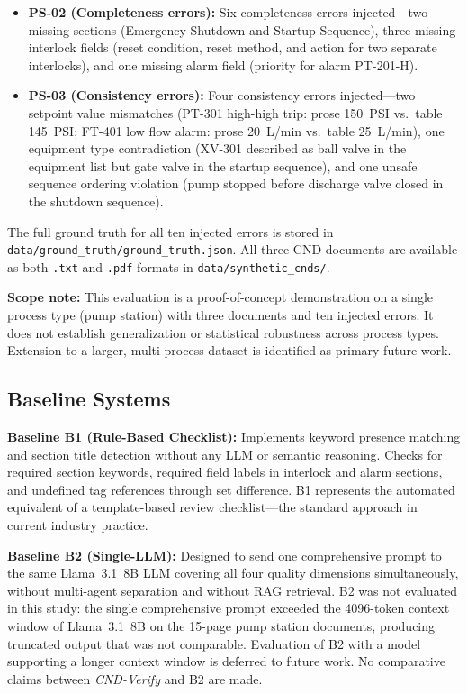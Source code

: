 \documentclass[journal]{IEEEtran}
\newcommand{\sys}{\textit{CND-Verify}}
\begin{document}
\begin{itemize}
  \item \textbf{PS-02 (Completeness errors):} Six completeness errors
  injected---two missing sections (Emergency Shutdown and Startup Sequence),
  three missing interlock fields (reset condition, reset method, and action for
  two separate interlocks), and one missing alarm field (priority for alarm
  PT-201-H).

  \item \textbf{PS-03 (Consistency errors):} Four consistency errors
  injected---two setpoint value mismatches (PT-301 high-high trip: prose
  150~PSI vs.\ table 145~PSI; FT-401 low flow alarm: prose 20~L/min vs.\ table
  25~L/min), one equipment type contradiction (XV-301 described as ball valve
  in the equipment list but gate valve in the startup sequence), and one unsafe
  sequence ordering violation (pump stopped before discharge valve closed in the
  shutdown sequence).
\end{itemize}

The full ground truth for all ten injected errors is stored in
\texttt{data/ground\_truth/ground\_truth.json}. All three CND documents are
available as both \texttt{.txt} and \texttt{.pdf} formats in
\texttt{data/synthetic\_cnds/}.

\textbf{Scope note:} This evaluation is a proof-of-concept demonstration on a
single process type (pump station) with three documents and ten injected errors.
It does not establish generalization or statistical robustness across process
types. Extension to a larger, multi-process dataset is identified as primary
future work.

\subsection{Baseline Systems}

\textbf{Baseline B1 (Rule-Based Checklist):} Implements keyword presence
matching and section title detection without any LLM or semantic reasoning.
Checks for required section keywords, required field labels in interlock and
alarm sections, and undefined tag references through set difference. B1
represents the automated equivalent of a template-based review
checklist---the standard approach in current industry practice.

\textbf{Baseline B2 (Single-LLM):} Designed to send one comprehensive prompt
to the same Llama~3.1~8B LLM covering all four quality dimensions
simultaneously, without multi-agent separation and without RAG retrieval.
B2 was not evaluated in this study: the single comprehensive prompt exceeded
the 4096-token context window of Llama~3.1~8B on the 15-page pump station
documents, producing truncated output that was not comparable. Evaluation of
B2 with a model supporting a longer context window is deferred to future work.
No comparative claims between \sys{} and B2 are made.
\end{document}
